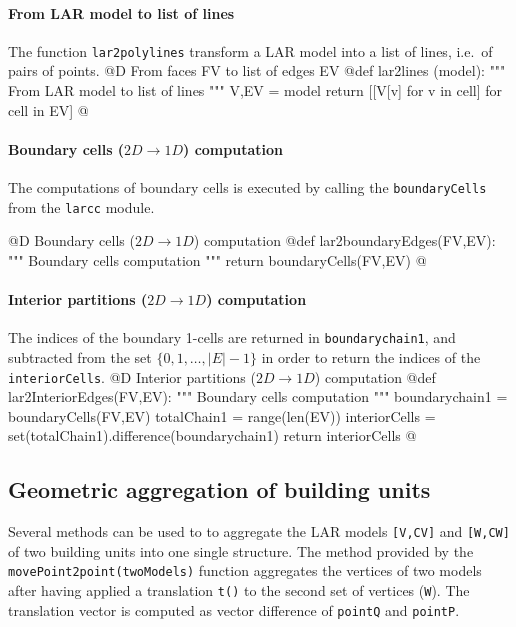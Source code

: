 \documentclass[11pt,oneside]{article}    %
\begin{document}
\paragraph{From LAR model to list of lines}
The function \texttt{lar2polylines}
transform a LAR model into a list of lines, i.e.~of pairs of points.
@D From faces FV to list of edges EV
@{def lar2lines (model):
    """ From LAR model to list of lines """
    V,EV = model
    return [[V[v] for v in cell] for cell in EV]
@}

\paragraph{Boundary cells ($2D\to 1D$) computation}
The computations of boundary cells is executed by calling the \texttt{boundaryCells} from the \texttt{larcc} module.

@D Boundary cells ($2D\to 1D$) computation
@{def lar2boundaryEdges(FV,EV):
    """ Boundary cells computation """
    return boundaryCells(FV,EV)
@}

\paragraph{Interior partitions ($2D\to 1D$) computation}
The indices of the boundary 1-cells are returned in \texttt{boundarychain1}, and subtracted from the set $\{0,1,\ldots,|E|-1\}$ in order to return the indices of the \texttt{interiorCells}.
@D Interior partitions ($2D\to 1D$) computation
@{def lar2InteriorEdges(FV,EV):
    """ Boundary cells computation """
    boundarychain1 = boundaryCells(FV,EV)
    totalChain1 = range(len(EV))
    interiorCells = set(totalChain1).difference(boundarychain1)
    return interiorCells
@}


\subsection{Geometric aggregation of building units}

Several methods can be used to to aggregate the LAR models \texttt{[V,CV]} and  \texttt{[W,CW]} of two building units into one single structure. The method provided by the \texttt{movePoint2point(twoModels)} function aggregates the vertices of two models after having applied a translation \texttt{t()} to the second set of vertices (\texttt{W}). The translation vector is computed as vector difference of \texttt{pointQ}
and \texttt{pointP}.
\end{document}
